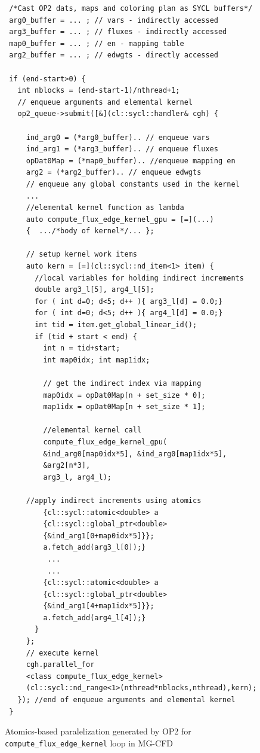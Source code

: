 \documentclass[runningheads]{llncs}
\begin{document}
\begin{figure}[!t]
\begin{verbatim}  
 /*Cast OP2 dats, maps and coloring plan as SYCL buffers*/
 arg0_buffer = ... ; // vars - indirectly accessed 
 arg3_buffer = ... ; // fluxes - indirectly accessed 
 map0_buffer = ... ; // en - mapping table
 arg2_buffer = ... ; // edwgts - directly accessed  
 
 if (end-start>0) {
   int nblocks = (end-start-1)/nthread+1;        
   // enqueue arguments and elemental kernel
   op2_queue->submit([&](cl::sycl::handler& cgh) {
     
     ind_arg0 = (*arg0_buffer).. // enqueue vars
     ind_arg1 = (*arg3_buffer).. // enqueue fluxes
     opDat0Map = (*map0_buffer).. //enqueue mapping en 
     arg2 = (*arg2_buffer).. // enqueue edwgts
     // enqueue any global constants used in the kernel
     ...
     //elemental kernel function as lambda
     auto compute_flux_edge_kernel_gpu = [=](...)
     {  .../*body of kernel*/... };
      
     // setup kernel work items
     auto kern = [=](cl::sycl::nd_item<1> item) {             
       //local variables for holding indirect increments
       double arg3_l[5], arg4_l[5];
       for ( int d=0; d<5; d++ ){ arg3_l[d] = 0.0;}        
       for ( int d=0; d<5; d++ ){ arg4_l[d] = 0.0;}
       int tid = item.get_global_linear_id();
       if (tid + start < end) {
         int n = tid+start;
         int map0idx; int map1idx;
            
         // get the indirect index via mapping
         map0idx = opDat0Map[n + set_size * 0];
         map1idx = opDat0Map[n + set_size * 1];

         //elemental kernel call
         compute_flux_edge_kernel_gpu(
         &ind_arg0[map0idx*5], &ind_arg0[map1idx*5],
         &arg2[n*3], 
         arg3_l, arg4_l);
	    
	 //apply indirect increments using atomics
         {cl::sycl::atomic<double> a 
         {cl::sycl::global_ptr<double>
         {&ind_arg1[0+map0idx*5]}}; 
         a.fetch_add(arg3_l[0]);}
          ...
          ...
         {cl::sycl::atomic<double> a
         {cl::sycl::global_ptr<double>
         {&ind_arg1[4+map1idx*5]}}; 
         a.fetch_add(arg4_l[4]);}          
       }
     };
     // execute kernel 
     cgh.parallel_for
     <class compute_flux_edge_kernel>
     (cl::sycl::nd_range<1>(nthread*nblocks,nthread),kern);
   }); //end of enqueue arguments and elemental kernel
 }          
\end{verbatim}
\vspace{-15pt}\caption{Atomics-based paralelization generated by OP2 for 
\texttt{compute\_flux\_edge\_kernel} loop in MG-CFD}
\label{fig/atomics}\vspace{-20pt}
\end{figure}
\end{document}
